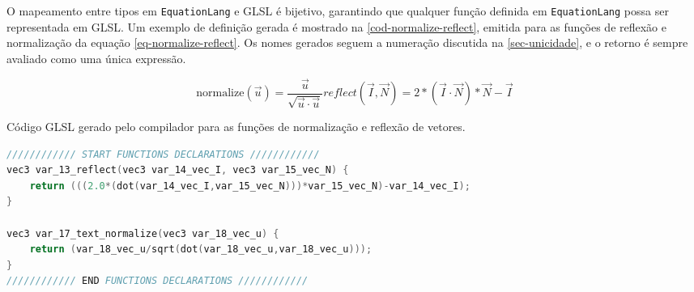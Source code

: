 O mapeamento entre tipos em \texttt{EquationLang} e GLSL é bijetivo, garantindo que qualquer função definida em \texttt{EquationLang} possa ser representada em GLSL. Um exemplo de definição gerada é mostrado na \autoref{cod-normalize-reflect}, emitida para as funções de reflexão e normalização da equação \autoref{eq-normalize-reflect}. Os nomes gerados seguem a numeração discutida na \autoref{sec-unicidade}, e o retorno é sempre avaliado como uma única expressão.

\label{eq-normalize-reflect} \begin{subequations}
\begin{equation}
  \text{normalize}(\vec{u}) = \frac{\vec{u}}{\sqrt{\vec{u} \cdot \vec{u}}}
\end{equation}

\begin{equation}
reflect(\vec I, \vec N) =  2*(\vec I \cdot \vec N)*\vec N - \vec I
\end{equation}
\end{subequations}

\begin{codigo}[htb]
   \caption{\small Código GLSL gerado pelo compilador para as funções de normalização e reflexão de vetores. }
   \label{cod-normalize-reflect}
\begin{lstlisting}[language=C, inputencoding=utf8]
//////////// START FUNCTIONS DECLARATIONS ////////////
vec3 var_13_reflect(vec3 var_14_vec_I, vec3 var_15_vec_N) {
    return (((2.0*(dot(var_14_vec_I,var_15_vec_N)))*var_15_vec_N)-var_14_vec_I);
}

vec3 var_17_text_normalize(vec3 var_18_vec_u) {
    return (var_18_vec_u/sqrt(dot(var_18_vec_u,var_18_vec_u)));
}
//////////// END FUNCTIONS DECLARATIONS ////////////

\end{lstlisting}
\end{codigo}
